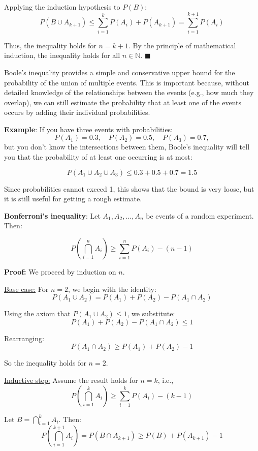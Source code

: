 \documentclass[twoside]{book}
\begin{document}
Applying the induction hypothesis to \( P(B) \):
\[
P(B \cup A_{k+1}) \leq \sum_{i=1}^{k} P(A_i) + P(A_{k+1}) = \sum_{i=1}^{k+1} P(A_i)
\]

Thus, the inequality holds for \( n = k+1 \). By the principle of mathematical induction, the inequality holds for all \( n \in \mathbb{N} \).
\hfill\(\blacksquare\)


Boole's inequality provides a simple and conservative upper bound for the probability of the union of multiple events. This is important because, without detailed knowledge of the relationships between the events (e.g., how much they overlap), we can still estimate the probability that at least one of the events occurs by adding their individual probabilities.

\textbf{Example}: If you have three events with probabilities:
\[
P(A_1) = 0.3, \quad P(A_2) = 0.5, \quad P(A_3) = 0.7,
\]
but you don’t know the intersections between them, Boole’s inequality will tell you that the probability of at least one occurring is at most:

\[
P(A_1 \cup A_2 \cup A_3) \leq 0.3 + 0.5 + 0.7 = 1.5
\]

Since probabilities cannot exceed 1, this shows that the bound is very loose, but it is still useful for getting a rough estimate.


\begin{textbox}
\textbf{Bonferroni's inequality}: Let \( A_1, A_2, \ldots, A_n \) be events of a random experiment. Then:

\[
P\left( \bigcap_{i=1}^n A_i \right) \geq \sum_{i=1}^n P(A_i) - (n - 1)
\]
\end{textbox}

\textbf{Proof:} We proceed by induction on \( n \).

\underline{Base case:} For \( n = 2 \),
we begin with the identity:
\[
P(A_1 \cup A_2) = P(A_1) + P(A_2) - P(A_1 \cap A_2)
\]

Using the axiom that \( P(A_1 \cup A_2) \leq 1 \), we substitute:
\[
P(A_1) + P(A_2) - P(A_1 \cap A_2) \leq 1
\]

Rearranging:
\[
 P(A_1 \cap A_2) \geq P(A_1) + P(A_2) - 1
\]

So the inequality holds for $n = 2$.

\underline{Inductive step:} Assume the result holds for \( n = k \), i.e.,
\[
P\left( \bigcap_{i=1}^{k} A_i \right) \geq \sum_{i=1}^{k} P(A_i) - (k - 1)
\]

Let \( B = \bigcap_{i=1}^{k} A_i \). Then:
\[
P\left( \bigcap_{i=1}^{k+1} A_i \right) = P(B \cap A_{k+1}) \geq P(B) + P(A_{k+1}) - 1
\]
\end{document}
